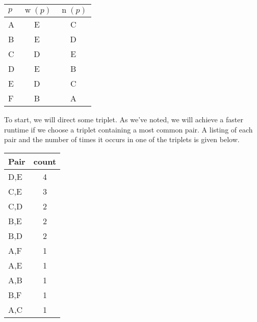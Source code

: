 \documentclass[12pt,x11names, rgb]{article}
\DeclareMathOperator{\w}{w}
\DeclareMathOperator{\n}{n}
\begin{document}
    \begin{center}
        \begin{tabular}{ l | c | c}
         $p$ & $\w(p)$ & $\n(p)$ \\
         \hline
          A &  E& C\\
          B &  E& D\\
          C &  D& E\\
          D &  E& B\\
          E &  D& C\\
          F &  B& A
        \end{tabular} %
    \end{center}
    \begin{comment}
        Assume E -> D
          E -> D is given, so player B's choices give B -> D
          E -> D is given, so player B's choices give B -> E
          E -> D is given, so player C's choices give E -> C
          E -> D is given, so player C's choices give D -> C
          E -> D is given, so player D's choices give B -> D
          E -> D is given, so player D's choices give B -> E
          E -> D is given, so player E's choices give E -> C
          E -> D is given, so player E's choices give D -> C
          D -> C is given, so player C's choices give E -> C
          D -> C is given, so player C's choices give E -> D
          D -> C is given, so player E's choices give E -> C
          D -> C is given, so player E's choices give E -> D
          E -> C is given, so player A's choices give A -> C
          E -> C is given, so player A's choices give A -> E
          E -> C is given, so player E's choices give D -> C
          E -> C is given, so player E's choices give E -> D
          D -> C is given, so player E's choices give E -> C
          D -> C is given, so player E's choices give E -> D
          Assume F -> B
            F -> B is given, so player F's choices give F -> A
            F -> B is given, so player F's choices give B -> A
            No more players to try, and G is acyclic: Success!
         F B A E D C
    \end{comment}
    To start, we will direct some triplet. As we've noted, we will achieve a faster runtime if we choose a triplet containing a most common pair. A listing of each pair and the number of times it occurs in one of the triplets is given below.
    \begin{center}
    \begin{tabular}{l | c}
        Pair & count \\
        \hline
        D,E & 4 \\
        C,E & 3 \\
        C,D & 2 \\
        B,E & 2 \\
        B,D & 2 \\
        A,F & 1 \\
        A,E & 1 \\
        A,B & 1 \\
        B,F & 1 \\
        A,C & 1 
    \end{tabular}
    \end{center}
\end{document}
